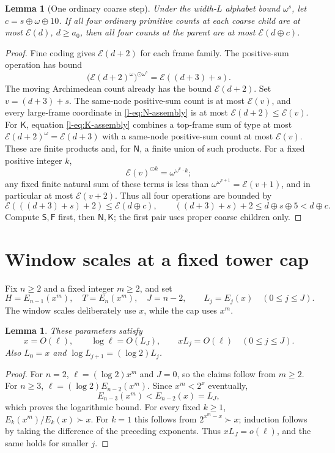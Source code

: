 \documentclass[11pt]{article}
\newtheorem{lemma}[theorem]{Lemma}
\theoremstyle{definition}
\theoremstyle{remark}
\newcommand{\hs}{\mathbin{\oplus}}
\newcommand{\od}{\mathbin{\odot}}
\newcommand{\EE}{\mathcal E}
\newcommand{\NN}{\mathsf N}
\newcommand{\SSS}{\mathsf S}
\newcommand{\KK}{\mathsf K}
\newcommand{\FF}{\mathsf F}
\numberwithin{equation}{section}
\begin{document}
\begin{lemma}[One ordinary coarse step]\label{ordinary-step}
Under the width-$L$ alphabet bound $\omega^s$, let
$c=s\hs\omega\hs10$. If all four ordinary primitive counts
at each coarse child are at most $\EE(d)$, $d\ge a_0$, then
all four counts at the parent are at most $\EE(d\hs c)$.
\end{lemma}
\begin{proof}
Fine coding gives $\EE(d+2)$ for each frame family.
The positive-sum operation has bound
\begin{equation}
 \bigl(\EE(d+2)^\omega\bigr)^{\od\omega^s}
 =\EE((d+3)+s).
 \label{ordinary-cost}
\end{equation}
The moving Archimedean count already has the bound $\EE(d+2)$.
Set $v=(d+3)+s$.  The same-node positive-sum count is at most
$\EE(v)$, and every large-frame coordinate in
\eqref{l-eq:N-assembly} is at most $\EE(d+2)\le\EE(v)$.
For $\KK$, equation \eqref{l-eq:K-assembly} combines a
top-frame sum of type at most
$\EE(d+2)^\omega=\EE(d+3)$ with a same-node positive-sum
count at most $\EE(v)$.  These are finite products and, for
$\NN$, a finite union of such products.  For a fixed positive
integer $k$,
\[
 \EE(v)^{\od k}=\omega^{\omega^v\cdot k};
\]
any fixed finite natural sum of these terms is less than
$\omega^{\omega^{v+1}}=\EE(v+1)$, and in particular at most
$\EE(v+2)$.  Thus all four operations are bounded by
\[
 \EE(((d+3)+s)+2)\le\EE(d\hs c),
 \qquad ((d+3)+s)+2\le d\hs s\hs5<d\hs c.
\]
Compute $\SSS,\FF$ first, then $\NN,\KK$; the first pair
uses proper coarse children only.
\end{proof}


\section{Window scales at a fixed tower cap}\label{window-tiers}

Fix \(n\ge2\) and a fixed integer \(m\ge2\), and set
\begin{equation}
 H=E_{n-1}(x^m),\quad T=E_n(x^m),\quad
 J=n-2,\qquad L_j=E_j(x)\quad(0\le j\le J).
 \label{h-eq-3.1}
\end{equation}
The window scales deliberately use \(x\), while the cap uses
\(x^m\).

\begin{lemma}\label{h-lem:scales}
These parameters satisfy
\begin{equation}
 x=O(\ell),\qquad \log\ell=O(L_J),\qquad
 xL_j=O(\ell)\quad(0\le j\le J).
 \label{h-eq-3.2}
\end{equation}
Also \(L_0=x\) and \(\log L_{j+1}=(\log2)L_j\).
\end{lemma}
\begin{proof}
For \(n=2\), \(\ell=(\log2)x^m\) and \(J=0\), so the
claims follow from \(m\ge2\).
For \(n\ge3\), \(\ell=(\log2)E_{n-2}(x^m)\).
Since \(x^m<2^x\) eventually,
\[
 E_{n-3}(x^m)<E_{n-2}(x)=L_J,
\]
which proves the logarithmic bound. For every fixed \(k\ge1\),
\(E_k(x^m)/E_k(x)\succ x\).
For \(k=1\) this follows from \(2^{x^m-x}\succ x\); induction
follows by taking the difference of the preceding exponents.
Thus \(xL_J=o(\ell)\), and the same holds for smaller \(j\).
\end{proof}
\end{document}
